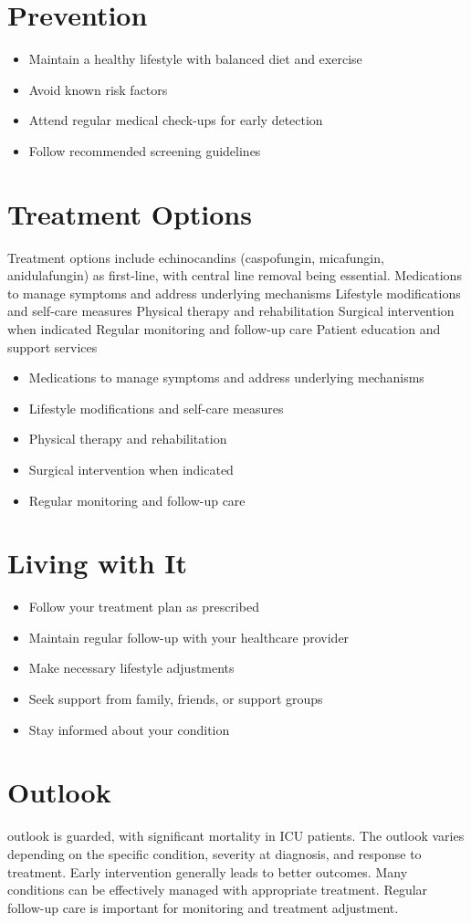 \section{Prevention}
\begin{itemize}[noitemsep]
  \item Maintain a healthy lifestyle with balanced diet and exercise
  \item Avoid known risk factors
  \item Attend regular medical check-ups for early detection
  \item Follow recommended screening guidelines
\end{itemize}
\section{Treatment Options}
Treatment options include echinocandins (caspofungin, micafungin, anidulafungin) as first-line, with central line removal being essential. Medications to manage symptoms and address underlying mechanisms Lifestyle modifications and self-care measures Physical therapy and rehabilitation Surgical intervention when indicated Regular monitoring and follow-up care Patient education and support services

\begin{itemize}[noitemsep]
  \item Medications to manage symptoms and address underlying mechanisms
  \item Lifestyle modifications and self-care measures
  \item Physical therapy and rehabilitation
  \item Surgical intervention when indicated
  \item Regular monitoring and follow-up care
\end{itemize}
\section{Living with It}
\begin{itemize}[noitemsep]
  \item Follow your treatment plan as prescribed
  \item Maintain regular follow-up with your healthcare provider
  \item Make necessary lifestyle adjustments
  \item Seek support from family, friends, or support groups
  \item Stay informed about your condition
\end{itemize}
\section{Outlook}
outlook is guarded, with significant mortality in ICU patients. The outlook varies depending on the specific condition, severity at diagnosis, and response to treatment. Early intervention generally leads to better outcomes. Many conditions can be effectively managed with appropriate treatment. Regular follow-up care is important for monitoring and treatment adjustment.
